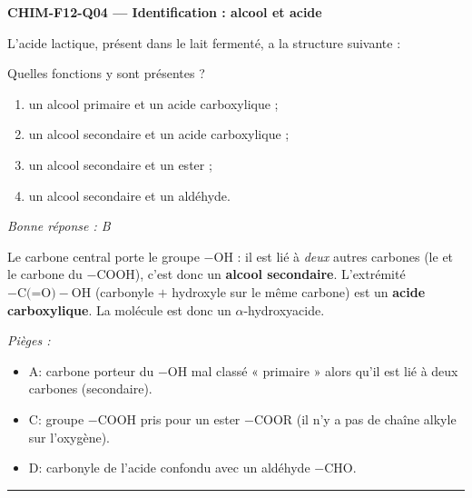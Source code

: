 \documentclass[11pt,a4paper]{article}
\begin{document}
\noindent\textbf{CHIM-F12-Q04 --- Identification : alcool et acide}\par
L'acide lactique, présent dans le lait fermenté, a la structure suivante :
\begin{center}\end{center}
Quelles fonctions y sont présentes ?
\begin{enumerate}[label=\Alph*)]
\item un alcool primaire et un acide carboxylique ;
\item un alcool secondaire et un acide carboxylique ;
\item un alcool secondaire et un ester ;
\item un alcool secondaire et un aldéhyde.
\end{enumerate}
\textit{Bonne réponse : B}\par
Le carbone central porte le groupe $-\text{OH}$ : il est lié à \emph{deux} autres carbones (le  et le carbone du $-\text{COOH}$), c'est donc un \textbf{alcool secondaire}. L'extrémité $-\text{C(=O)}-\text{OH}$ (carbonyle $+$ hydroxyle sur le même carbone) est un \textbf{acide carboxylique}. La molécule est donc un $\alpha$-hydroxyacide.\par
\textit{Pièges :}
\begin{itemize}
\item A: carbone porteur du $-\text{OH}$ mal classé « primaire » alors qu'il est lié à deux carbones (secondaire).
\item C: groupe $-\text{COOH}$ pris pour un ester $-\text{COOR}$ (il n'y a pas de chaîne alkyle sur l'oxygène).
\item D: carbonyle de l'acide confondu avec un aldéhyde $-\text{CHO}$.
\end{itemize}
\vspace{8pt}\hrule\vspace{8pt}
\end{document}

